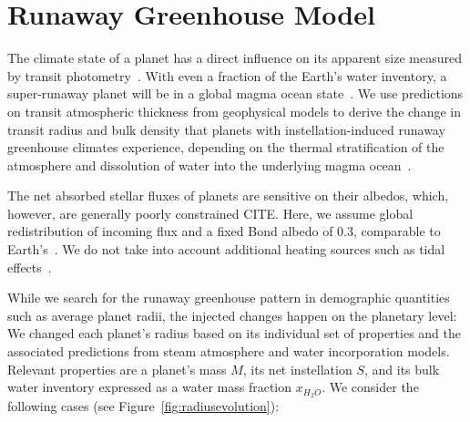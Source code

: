 \documentclass[twocolumn,twocolappendix]{aastex631}
\begin{document}
\section{Runaway Greenhouse Model}\label{sec:met_rghmodel}
The climate state of a planet has a direct influence on its apparent size measured by transit photometry~\citep{Turbet2019,Turbet2020,Mousis2020,2021ApJ...914...84A}.
With even a fraction of the Earth's water inventory, a super-runaway planet will be in a global magma ocean state~\citep{2021JGRE..12606711L,Boukrouche2021}.
We use predictions on transit atmospheric thickness from geophysical models to derive the change in transit radius and bulk density that planets with instellation-induced runaway greenhouse climates experience, depending on the thermal stratification of the atmosphere and dissolution of water into the underlying magma ocean~\citep{Dorn2021,2023Icar..39015265S}.

The net absorbed stellar fluxes of planets are sensitive on their albedos, which, however, are generally poorly constrained CITE.
Here, we assume global redistribution of incoming flux and a fixed Bond albedo of $0.3$, comparable to Earth's~\citep{Haar1971}.
We do not take into account additional heating sources such as tidal effects~\citep[e.g.,][]{Barnes2013}.


While we search for the runaway greenhouse pattern in demographic quantities such as average planet radii, the injected changes happen on the planetary level: We changed each planet's radius based on its individual set of properties and the associated predictions from steam atmosphere and water incorporation models.
Relevant properties are a planet's mass $M$, its net instellation $S$, and its bulk water inventory expressed as a water mass fraction $x_{H_2O}$.
We consider the following cases (see Figure~\ref{fig:radiusevolution}):
\end{document}
